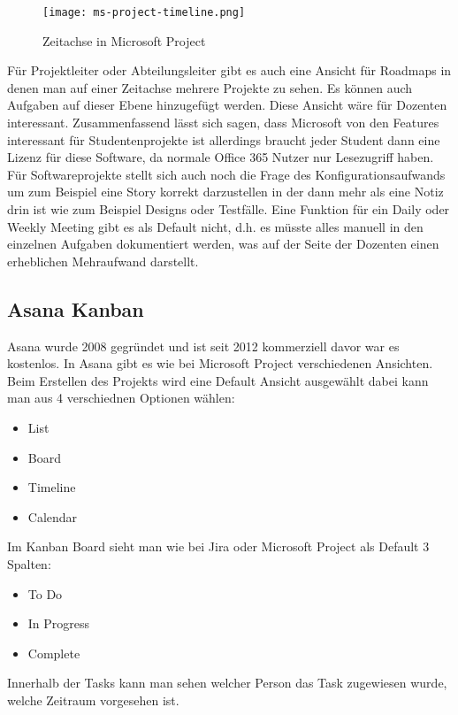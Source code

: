 \begin{figure}[H]
	\centering
	\texttt{[image: ms-project-timeline.png]}
    \caption{Zeitachse in Microsoft Project}
	\label{fig:timelinemsproject}
\end{figure}

Für Projektleiter oder Abteilungsleiter gibt es auch eine Ansicht für Roadmaps in denen man auf einer Zeitachse mehrere Projekte zu sehen. Es können auch Aufgaben auf dieser Ebene hinzugefügt werden. Diese Ansicht wäre für Dozenten interessant. Zusammenfassend lässt sich sagen, dass Microsoft von den Features interessant für Studentenprojekte ist allerdings braucht jeder Student dann eine Lizenz für diese Software, da normale Office 365 Nutzer nur Lesezugriff haben. Für Softwareprojekte stellt sich auch noch die Frage des Konfigurationsaufwands um zum Beispiel eine Story korrekt darzustellen in der dann mehr als eine Notiz drin ist wie zum Beispiel Designs oder Testfälle.  Eine Funktion für ein Daily oder Weekly Meeting gibt es als Default nicht, d.h. es müsste alles manuell in den einzelnen Aufgaben dokumentiert werden, was auf der Seite der Dozenten einen erheblichen Mehraufwand darstellt.  

\subsection{Asana Kanban}

Asana wurde 2008 gegründet und ist seit 2012 kommerziell davor war es kostenlos. In Asana gibt es wie bei Microsoft Project verschiedenen Ansichten. Beim Erstellen des Projekts wird eine Default Ansicht ausgewählt dabei kann man aus 4 verschiednen Optionen wählen:
\begin{itemize}
    \item List 
    \item Board 
    \item Timeline  
    \item Calendar 
\end{itemize}

Im Kanban Board sieht man wie bei Jira oder Microsoft Project als Default 3 Spalten:
\begin{itemize}
    \item To Do
    \item In Progress
    \item Complete
\end{itemize}

Innerhalb der Tasks kann man sehen welcher Person das Task zugewiesen wurde, welche Zeitraum vorgesehen ist.

